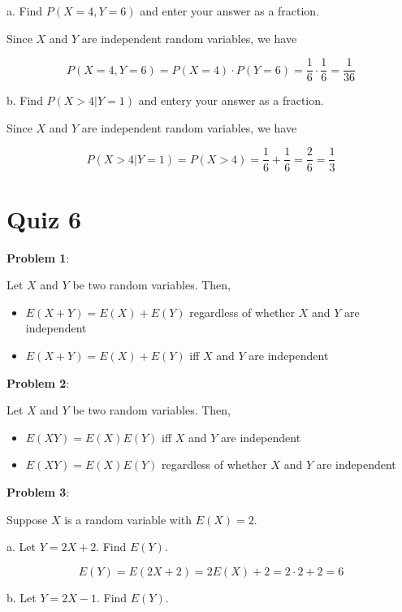 \documentclass{article}
\begin{document}
\indent\indent a. Find $P(X=4,Y=6)$ and enter your answer as a fraction. 

{\color{blue}

Since $X$ and $Y$ are independent random variables, we have

$$P(X=4, Y=6)=P(X=4)\cdot P(Y=6)=\frac{1}{6}\cdot\frac{1}{6}=\frac{1}{36}$$

}

\indent\indent b. Find $P(X>4|Y=1)$ and entery your answer as a fraction. 

{\color{blue}

Since $X$ and $Y$ are independent random variables, we have

$$P(X>4|Y=1)=P(X>4)=\frac{1}{6}+\frac{1}{6}=\frac{2}{6}=\frac{1}{3}$$

}

\section{Quiz 6}

\noindent\textbf{Problem 1}:

Let $X$ and $Y$ be two random variables. Then,

\begin{itemize}
    \item {\color{blue}$E(X+Y)=E(X)+E(Y)$ regardless of whether $X$ and $Y$ are independent}
    \item $E(X+Y)=E(X)+E(Y)$ iff $X$ and $Y$ are independent
\end{itemize}

\noindent\textbf{Problem 2}:

Let $X$ and $Y$ be two random variables. Then,

\begin{itemize}
    \item {\color{blue}$E(XY)=E(X)E(Y)$  iff $X$ and $Y$ are independent}
    \item $E(XY)=E(X)E(Y)$ regardless of whether $X$ and $Y$ are independent
\end{itemize}

\noindent\textbf{Problem 3}:

Suppose $X$ is a random variable with $E(X)=2$.

\indent\indent a. Let $Y=2X+2$. Find $E(Y)$.

{\color{blue}

$$E(Y)=E(2X+2)=2E(X)+2=2\cdot2+2=6$$

}

\indent\indent b. Let $Y=2X-1$. Find $E(Y)$.
\end{document}
